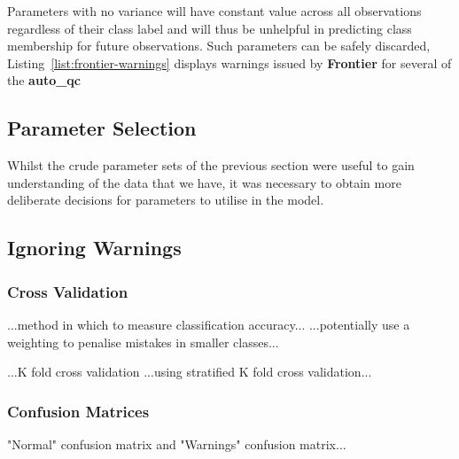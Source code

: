 Parameters with no variance will have constant value across all observations
regardless of their class label and will thus be unhelpful in predicting class
membership for future observations. Such parameters can be safely discarded,
Listing~\ref{list:frontier-warnings} displays warnings issued by
\textbf{Frontier} for several of the \textbf{auto\_qc}

\subsection{Parameter Selection}

Whilst the crude parameter sets of the previous section were useful to gain
understanding of the data that we have, it was necessary to obtain more
deliberate decisions for parameters to utilise in the model.

\subsection{Ignoring Warnings}

\subsubsection{Cross Validation}

...method in which to measure classification accuracy...
...potentially use a weighting to penalise mistakes in smaller classes...

...K fold cross validation
...using stratified K fold cross validation...

\subsubsection{Confusion Matrices}
"Normal" confusion matrix and "Warnings" confusion matrix...

